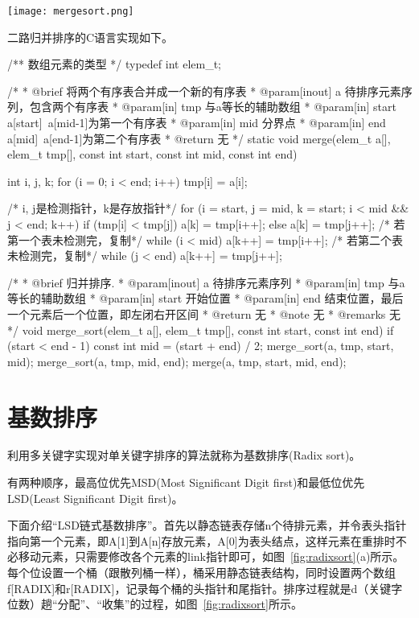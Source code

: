 \begin{center}
\texttt{[image: mergesort.png]}\\
\label{fig:mergesort}
\end{center}

二路归并排序的C语言实现如下。
\begin{Codex}[label=heap_sort.c]
/** 数组元素的类型 */
typedef int elem_t;

 /*
  * @brief 将两个有序表合并成一个新的有序表
  * @param[inout] a 待排序元素序列，包含两个有序表
  * @param[in] tmp 与a等长的辅助数组
  * @param[in] start a[start]~a[mid-1]为第一个有序表
  * @param[in] mid 分界点
  * @param[in] end a[mid]~a[end-1]为第二个有序表
  * @return 无
  */
static void merge(elem_t a[], elem_t tmp[], const int start, const int mid, const int end) {
    int i, j, k;
    for (i = 0; i < end; i++) tmp[i] = a[i];

    /* i, j是检测指针，k是存放指针*/
    for (i = start, j = mid, k = start; i < mid && j < end; k++) {
        if (tmp[i] < tmp[j]) {
            a[k] = tmp[i++];
        } else {
            a[k] = tmp[j++];
        }
    }
    /* 若第一个表未检测完，复制*/
    while (i < mid) a[k++] = tmp[i++];
    /* 若第二个表未检测完，复制*/
    while (j < end) a[k++] = tmp[j++];
}

 /*
  * @brief 归并排序.
  * @param[inout] a 待排序元素序列
  * @param[in] tmp 与a等长的辅助数组
  * @param[in] start 开始位置
  * @param[in] end 结束位置，最后一个元素后一个位置，即左闭右开区间
  * @return 无
  * @note 无
  * @remarks 无
  */
void merge_sort(elem_t a[], elem_t tmp[], const int start, const int end) {
    if (start < end - 1) {
        const int mid = (start + end) / 2;
        merge_sort(a, tmp, start, mid);
        merge_sort(a, tmp, mid, end);
        merge(a, tmp, start, mid, end);
    }
}
\end{Codex}


\section{基数排序} %
利用多关键字实现对单关键字排序的算法就称为基数排序(Radix sort)。

有两种顺序，最高位优先MSD(Most Significant Digit first)和最低位优先LSD(Least Significant Digit first)。

下面介绍“LSD链式基数排序”。首先以静态链表存储n个待排元素，并令表头指针指向第一个元素，即A[1]到A[n]存放元素，A[0]为表头结点，这样元素在重排时不必移动元素，只需要修改各个元素的link指针即可，如图~\ref{fig:radixsort}(a)所示。每个位设置一个桶（跟散列桶一样），桶采用静态链表结构，同时设置两个数组f[RADIX]和r[RADIX]，记录每个桶的头指针和尾指针。排序过程就是d（关键字位数）趟“分配”、“收集”的过程，如图~\ref{fig:radixsort}所示。

